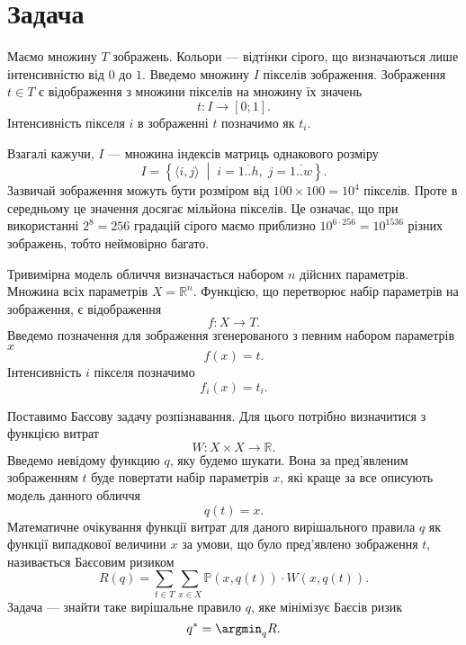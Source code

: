 \section{Задача}

Маємо множину $T$ зображень.
Кольори --- відтінки сірого, що визначаються лише інтенсивністю від $0$ до $1$.
Введемо множину $I$ пікселів зображення.
Зображення $t \in T$ є відображення з множини пікселів на множину їх значень
\begin{equation*}
  t: I \rightarrow \left[ 0; 1 \right].
\end{equation*}
Інтенсивність пікселя $i$ в зображенні $t$ позначимо як $t_i$.

Взагалі кажучи, $I$ --- множина індексів матриць однакового розміру
\begin{equation*}
  I = \left\{ \langle i, j \rangle
    \;\middle|\; i = \overline{1..h},\; j = \overline{1..w}\right\}.
\end{equation*}
Зазвичай зображення можуть бути розміром від $100\times100=10^4$ пікселів.
Проте в середньому це значення досягає мільйона пікселів.
Це означає,
що при використанні $2^8=256$ градацій сірого маємо приблизно
$10^{6 \cdot 256}=10^{1536}$ різних зображень, тобто неймовірно багато.

Тривимірна модель обличчя визначається набором $n$ дійсних параметрів.
Множина всіх параметрів $X = \mathbb{R}^n$.
Функцією, що перетворює набір параметрів на зображення, є відображення
\begin{equation*}
  f: X \rightarrow T.
\end{equation*}
Введемо позначення для зображення згенерованого з певним набором параметрів $x$
\begin{equation*}
  f\left( x \right) = t.
\end{equation*}
Інтенсивність $i$ пікселя позначимо
\begin{equation*}
  f_i\left( x \right) = t_i.
\end{equation*}

Поставимо Баєсову задачу розпізнавання.
Для цього потрібно визначитися з функцією витрат
\cite{berger2013statistical}
\begin{equation*}
  W: X \times X \rightarrow \mathbb{R}.
\end{equation*}
Введемо невідому функцию $q$, яку будемо шукати.
Вона за пред'явленим зображенням $t$ буде повертати набір параметрів $x$,
які краще за все описують модель данного обличчя
\begin{equation*}
  q\left( t \right) = x.
\end{equation*}
Математичне очікування функції витрат для даного вирішального правила $q$
як функції випадкової величини $x$ за умови,
що було пред'явлено зображення $t$, називається Баєсовим ризиком
\begin{equation*}
  R \left( q \right)
  = \sum\limits_{t \in T} \sum\limits_{x \in X}
    \mathbb{P} \left( x,  q\left( t \right) \right)
    \cdot W \left( x, q\left( t \right) \right).
\end{equation*}
Задача --- знайти таке вирішальне правило $q$, яке мінімізує Баєсів ризик
\begin{equation*}
  q^* = \argmin_q R.
\end{equation*}


